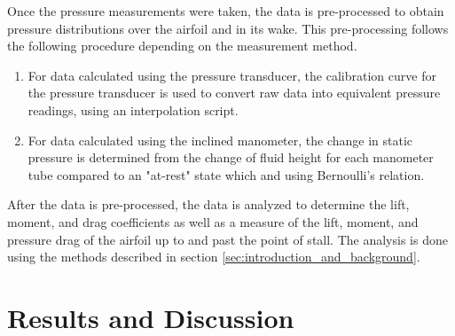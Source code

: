\documentclass[runningheads]{llncs}
\begin{document}
Once the pressure measurements were taken, the data is pre-processed to obtain pressure distributions over the airfoil and in its wake. This pre-processing follows the following procedure depending on the measurement method.

\begin{enumerate}

    \item For data calculated using the pressure transducer, the calibration curve for the pressure transducer is used to convert raw data into equivalent pressure readings, using an interpolation script.

    \item For data calculated using the inclined manometer, the change in static pressure is determined from the change of fluid height for each manometer tube compared to an "at-rest" state which and using Bernoulli's relation.

\end{enumerate}

After the data is pre-processed, the data is analyzed to determine the lift, moment, and drag coefficients as well as a measure of the lift, moment, and pressure drag of the airfoil up to and past the point of stall. The analysis is done using the methods described in section \ref{sec:introduction_and_background}.




\section{Results and Discussion}
\end{document}
